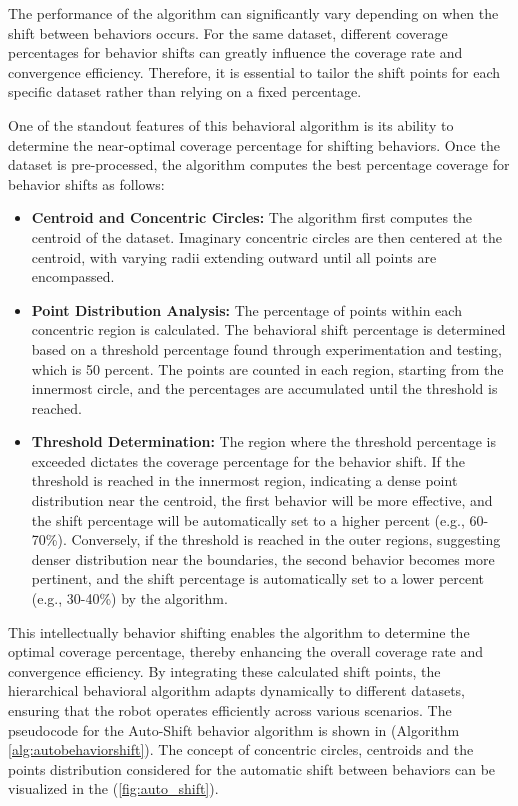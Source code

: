 \vspace{3mm}   

The performance of the algorithm can significantly vary depending on when the shift between behaviors occurs. For the same dataset, different coverage percentages for behavior shifts can greatly influence the coverage rate and convergence efficiency. Therefore, it is essential to tailor the shift points for each specific dataset rather than relying on a fixed percentage.

\vspace{3mm}   

One of the standout features of this behavioral algorithm is its ability to determine the near-optimal coverage percentage for shifting behaviors. Once the dataset is pre-processed, the algorithm computes the best percentage coverage for behavior shifts as follows:

\begin{itemize}
    \item \textbf{Centroid and Concentric Circles:  }The algorithm first computes the centroid of the dataset. Imaginary concentric circles are then centered at the centroid, with varying radii extending outward until all points are encompassed.
    \item \textbf{Point Distribution Analysis:  }The percentage of points within each concentric region is calculated. The behavioral shift percentage is determined based on a threshold percentage found through experimentation and testing, which is 50 percent. The points are counted in each region, starting from the innermost circle, and the percentages are accumulated until the threshold is reached.
    \item \textbf{Threshold Determination:  }The region where the threshold percentage is exceeded dictates the coverage percentage for the behavior shift. If the threshold is reached in the innermost region, indicating a dense point distribution near the centroid, the first behavior will be more effective, and the shift percentage will be automatically set to a higher percent (e.g., 60-70\%). Conversely, if the threshold is reached in the outer regions, suggesting denser distribution near the boundaries, the second behavior becomes more pertinent, and the shift percentage is automatically set to a lower percent (e.g., 30-40\%) by the algorithm. 
\end{itemize} 

This intellectually behavior shifting enables the algorithm to determine the optimal coverage percentage, thereby enhancing the overall coverage rate and convergence efficiency. By integrating these calculated shift points, the hierarchical behavioral algorithm adapts dynamically to different datasets, ensuring that the robot operates efficiently across various scenarios. The pseudocode for the Auto-Shift behavior algorithm is shown in (Algorithm \autoref{alg:autobehaviorshift}). The concept of concentric circles, centroids and the points distribution considered for the automatic shift between behaviors can be visualized in the (\autoref{fig:auto_shift}).


